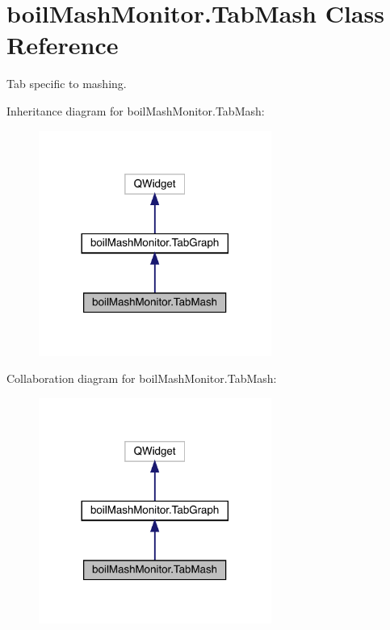 \hypertarget{classboil_mash_monitor_1_1_tab_mash}{}\section{boil\+Mash\+Monitor.\+Tab\+Mash Class Reference}
\label{classboil_mash_monitor_1_1_tab_mash}


Tab specific to mashing.  




Inheritance diagram for boil\+Mash\+Monitor.\+Tab\+Mash\+:\nopagebreak
\begin{figure}[H]
\begin{center}
\leavevmode
\includegraphics[width=216pt]{classboil_mash_monitor_1_1_tab_mash__inherit__graph}
\end{center}
\end{figure}


Collaboration diagram for boil\+Mash\+Monitor.\+Tab\+Mash\+:\nopagebreak
\begin{figure}[H]
\begin{center}
\leavevmode
\includegraphics[width=216pt]{classboil_mash_monitor_1_1_tab_mash__coll__graph}
\end{center}
\end{figure}
